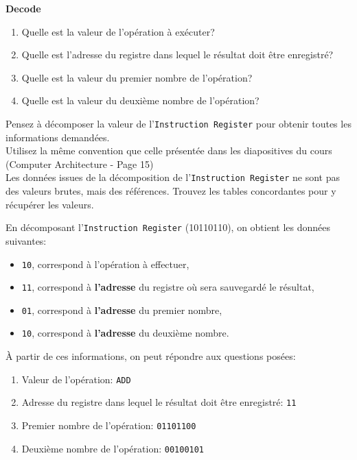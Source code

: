 \begin{Exercice}[5 minutes] \textbf{Decode}
    \begin{enumerate}
        \item Quelle est la valeur de l'opération à exécuter?
        \item Quelle est l'adresse du registre dans lequel le résultat doit être enregistré?
        \item Quelle est la valeur du premier nombre de l'opération?
        \item Quelle est la valeur du deuxième nombre de l'opération?
    \end{enumerate}

    \begin{conseil}
        Pensez à décomposer la valeur de l'\lstinline{Instruction Register} pour obtenir toutes les informations demandées. \\
        Utilisez la même convention que celle présentée dans les diapositives du cours (Computer Architecture - Page 15) \\
        Les données issues de la décomposition de l'\lstinline{Instruction Register} ne sont pas des valeurs brutes, mais des références. Trouvez les tables concordantes pour y récupérer les valeurs.
    \end{conseil}

    \begin{solution}
        En décomposant l'\lstinline{Instruction Register} (10110110), on obtient les données suivantes:
        \begin{itemize}
            \item \lstinline{10}, correspond à l'opération à effectuer,
            \item \lstinline{11}, correspond à \textbf{l'adresse} du registre où sera sauvegardé le résultat,
            \item \lstinline{01}, correspond à \textbf{l'adresse} du premier nombre,
            \item \lstinline{10}, correspond à \textbf{l'adresse} du deuxième nombre.\\
        \end{itemize}
        
    À partir de ces informations, on peut répondre aux questions posées:
       \begin{enumerate}
           \item Valeur de l'opération: \lstinline{ADD}
           \item Adresse du registre dans lequel le résultat doit être enregistré: \lstinline{11}
           \item Premier nombre de l'opération: \lstinline{01101100}
           \item Deuxième nombre de l'opération: \lstinline{00100101}
       \end{enumerate}
    \end{solution}
\end{Exercice}

